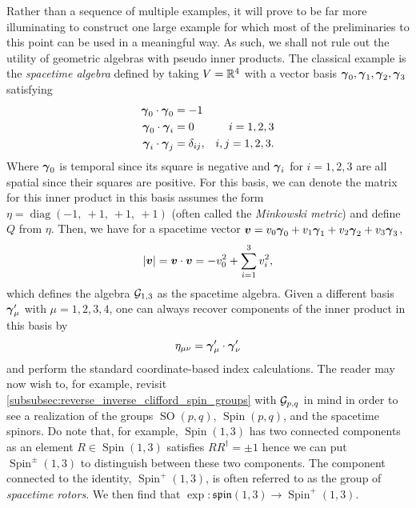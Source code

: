 Rather than a sequence of multiple examples, it will prove to be far more illuminating to construct one large example for which most of the preliminaries to this point can be used in a meaningful way. As such, we shall not rule out the utility of geometric algebras with pseudo inner products. The classical example is the \emph{spacetime algebra} defined by taking $V=\mathbb{R}^4$ with a vector basis $\boldsymbol{\gamma}_0,\boldsymbol{\gamma}_1,\boldsymbol{\gamma}_2,\boldsymbol{\gamma}_3$ satisfying
\begin{subequations}
\begin{align}
\boldsymbol{\gamma}_0 \cdot \boldsymbol{\gamma}_0 &= -1\\
\boldsymbol{\gamma}_0 \cdot \boldsymbol{\gamma}_i &= 0  &i=1,2,3\\
\boldsymbol{\gamma}_i \cdot \boldsymbol{\gamma}_j &= \delta_{ij}, &i,j=1,2,3.
\end{align}
\end{subequations}
Where $\boldsymbol{\gamma}_0$ is temporal since its square is negative and $\boldsymbol{\gamma}_i$ for $i=1,2,3$ are all spatial since their squares are positive. For this basis, we can denote the matrix for this inner product in this basis assumes the form $\eta =\operatorname{diag}(-1,~ +1,~ +1,~+1)$ (often called the \emph{Minkowski metric}) and define $Q$ from $\eta$. Then, we have for a spacetime vector $\boldsymbol{v} = v_0 \boldsymbol{\gamma}_0 +v_1 \boldsymbol{\gamma}_1 + v_2 \boldsymbol{\gamma}_2 + v_3 \boldsymbol{\gamma}_3$,
\begin{equation}
\label{eq:spacetime_inner_product}
|\boldsymbol{v}| = \boldsymbol{v} \cdot \boldsymbol{v} = -v_0^2 + \sum_{i=1}^3 v_i^2,
\end{equation}
which defines the algebra $\mathcal{G}_{1,3}$ as the spacetime algebra. Given a different basis $\boldsymbol{\gamma}'_\mu$ with $\mu = 1,2,3,4$, one can always recover components of the inner product in this basis by
\begin{equation}
\eta_{\mu \nu} = \boldsymbol{\gamma}'_\mu \cdot \boldsymbol{\gamma}'_\nu
\end{equation}
and perform the standard coordinate-based index calculations. The reader may now wish to, for example, revisit \cref{subsubsec:reverse_inverse_clifford_spin_groups} with $\mathcal{G}_{p,q}$ in mind in order to see a realization of the groups $\operatorname{SO}(p,q)$, $\operatorname{Spin}(p,q)$, and the spacetime spinors. Do note that, for example, $\operatorname{Spin}(1,3)$ has two connected components as an element $R\in \operatorname{Spin}(1,3)$ satisfies $RR^\dagger = \pm 1$ hence we can put $\operatorname{Spin}^\pm(1,3)$ to distinguish between these two components. The component connected to the identity, $\operatorname{Spin}^+(1,3)$, is often referred to as the group of \emph{spacetime rotors}. We then find that $\exp \colon \mathfrak{spin}(1,3) \to \operatorname{Spin}^+(1,3)$.

